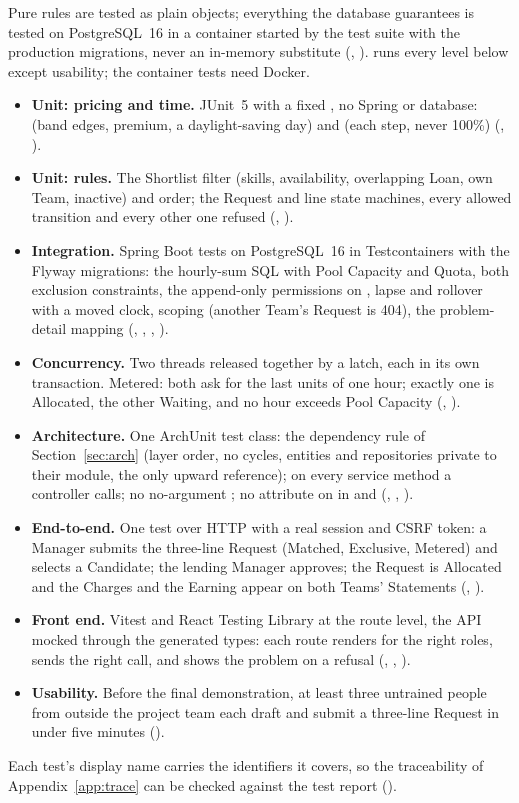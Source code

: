Pure rules are tested as plain objects; everything the database guarantees is tested on PostgreSQL~16 in a container started by the test suite with the production migrations, never an in-memory substitute (, ).  runs every level below except usability; the container tests need Docker.
\begin{itemize}
  \item \textbf{Unit: pricing and time.} JUnit~5 with a fixed , no Spring or database:  (band edges, premium, a daylight-saving day) and  (each step, never 100\%) (, ).
  \item \textbf{Unit: rules.} The Shortlist filter (skills, availability, overlapping Loan, own Team, inactive) and order; the Request and line state machines, every allowed transition and every other one refused (, ).
  \item \textbf{Integration.} Spring Boot tests on PostgreSQL~16 in Testcontainers with the Flyway migrations: the hourly-sum SQL with Pool Capacity and Quota, both exclusion constraints, the append-only permissions on , lapse and rollover with a moved clock, scoping (another Team's Request is 404), the problem-detail mapping (, , , ).
  \item \textbf{Concurrency.} Two threads released together by a latch, each in its own transaction. Metered: both ask for the last units of one hour; exactly one is Allocated, the other Waiting, and no hour exceeds Pool Capacity (, ).
  \item \textbf{Architecture.} One ArchUnit test class: the dependency rule of Section~\ref{sec:arch} (layer order, no cycles, entities and repositories private to their module,  the only upward reference);  on every service method a controller calls; no no-argument ; no  attribute on  in  and  (, , ).
  \item \textbf{End-to-end.} One test over HTTP with a real session and CSRF token: a Manager submits the three-line Request (Matched, Exclusive, Metered) and selects a Candidate; the lending Manager approves; the Request is Allocated and the Charges and the Earning appear on both Teams' Statements (, ).
  \item \textbf{Front end.} Vitest and React Testing Library at the route level, the API mocked through the generated types: each route renders for the right roles, sends the right call, and shows the problem  on a refusal (, , ).
  \item \textbf{Usability.} Before the final demonstration, at least three untrained people from outside the project team each draft and submit a three-line Request in under five minutes ().
\end{itemize}
Each test's display name carries the identifiers it covers, so the traceability of Appendix~\ref{app:trace} can be checked against the test report ().
